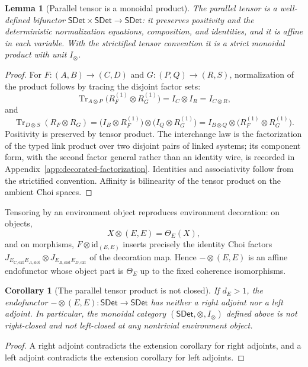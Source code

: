 \documentclass[11pt,a4paper]{article}
\theoremstyle{definition}
\theoremstyle{plain}
\newtheorem{lemma}[theorem]{Lemma}
\newtheorem{corollary}[theorem]{Corollary}
\theoremstyle{remark}
\DeclareMathOperator{\Tr}{Tr}
\newcommand{\id}{\mathrm{id}}
\newcommand{\SDet}{\mathsf{SDet}}
\begin{document}
\begin{lemma}[Parallel tensor is a monoidal product]
\label{lem:parallel}
The parallel tensor is a well-defined bifunctor
$\SDet\times\SDet\to\SDet$: it preserves positivity and the
deterministic normalization equations, composition, and identities, and
it is affine in each variable. With the strictified tensor convention it
is a strict monoidal product with unit $I_\otimes$.
\end{lemma}
\begin{proof}
For $F:(A,B)\to(C,D)$ and $G:(P,Q)\to(R,S)$, normalization of the
product follows by tracing the disjoint factor sets:
\[
\Tr_{A\otimes P}\bigl(R_F^{(1)}\otimes R_G^{(1)}\bigr)
=I_C\otimes I_R
=I_{C\otimes R},
\]
and
\[
\Tr_{D\otimes S}(R_F\otimes R_G)
=\bigl(I_B\otimes R_F^{(1)}\bigr)\otimes\bigl(I_Q\otimes R_G^{(1)}\bigr)
=I_{B\otimes Q}\otimes\bigl(R_F^{(1)}\otimes R_G^{(1)}\bigr).
\]
Positivity is preserved by tensor product. The interchange law is the
factorization of the typed link product over two disjoint pairs of
linked systems; its component form, with the second factor general
rather than an identity wire, is recorded in
Appendix~\ref{app:decorated-factorization}. Identities and
associativity follow from the strictified convention. Affinity is
bilinearity of the tensor product on the ambient Choi spaces.
\end{proof}

Tensoring by an environment object reproduces environment decoration:
on objects,
\[
X\otimes(E,E)=\Theta_E(X),
\]
and on morphisms, $F\otimes\id_{(E,E)}$ inserts precisely the identity
Choi factors
$J_{E_{C,\mathrm{ext}}E_{A,\mathrm{slot}}}\otimes
J_{E_{B,\mathrm{slot}}E_{D,\mathrm{ext}}}$
of the decoration map. Hence $-\otimes(E,E)$ is an affine endofunctor
whose object part is $\Theta_E$ up to the fixed coherence isomorphisms.

\begin{corollary}[The parallel tensor product is not closed]
\label{cor:not-closed}
If $d_E>1$, the endofunctor $-\otimes(E,E):\SDet\to\SDet$ has neither a
right adjoint nor a left adjoint. In particular, the monoidal category
$(\SDet,\otimes,I_\otimes)$ defined above is not right-closed and not
left-closed at any nontrivial environment object.
\end{corollary}
\begin{proof}
A right adjoint contradicts the extension corollary for right adjoints,
and a left adjoint contradicts the extension corollary for left
adjoints.
\end{proof}
\end{document}
